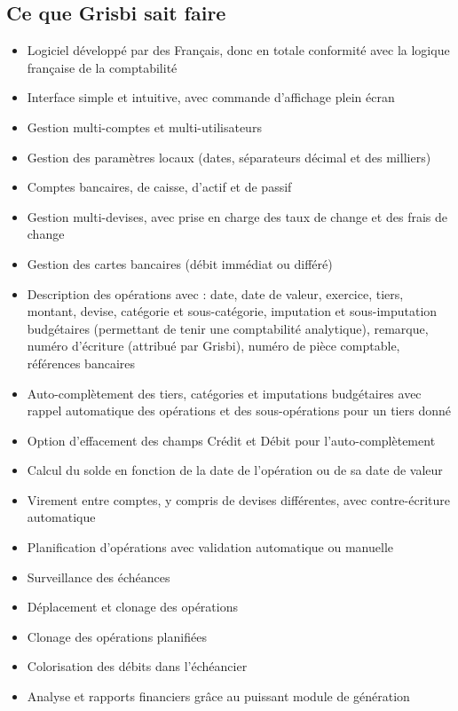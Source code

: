 \subsection{Ce que Grisbi sait faire}

\begin{itemize}
	\item Logiciel développé par des Français, donc en totale conformité avec la logique française de la comptabilité
	\item Interface simple et intuitive, avec commande d'affichage plein écran
	\item Gestion multi-comptes et multi-utilisateurs
	\item Gestion des paramètres locaux (dates, séparateurs décimal et des milliers)	
	\item Comptes bancaires, de caisse, d'actif et de passif
	\item Gestion multi-devises, avec prise en charge des taux de change et des frais de change
	\item Gestion des cartes bancaires (débit immédiat ou différé)	
	\item Description des opérations avec : date, date de valeur, exercice, tiers,
	montant, devise, catégorie et sous-catégorie, imputation et sous-imputation
	budgétaires (permettant de tenir une comptabilité analytique), remarque, numéro d'écriture (attribué par Grisbi), numéro de pièce comptable, références bancaires
	\item Auto-complètement des tiers, catégories et imputations budgétaires avec rappel automatique des  opérations et des sous-opérations pour un tiers donné
	\item Option d'effacement des champs Crédit et Débit pour l'auto-complètement
	\item Calcul du solde en fonction de la date de l'opération ou de sa date de valeur
	\item Virement entre comptes, y compris de devises différentes, avec contre-écriture automatique
	\item Planification d'opérations avec validation automatique ou manuelle
	\item Surveillance des échéances
	\item Déplacement et clonage des opérations
	\item Clonage des opérations planifiées
	\item Colorisation des débits dans l'échéancier
	\item Analyse et rapports financiers grâce au puissant module de génération

\end{itemize}
